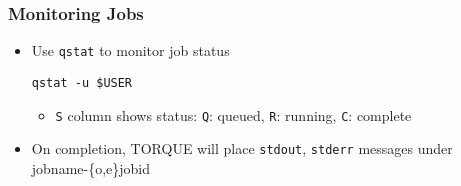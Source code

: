 \begin{frame}\frametitle{Monitoring Jobs}

\begin{itemize}
\item
  Use \texttt{qstat} to monitor job status

  \texttt{qstat -u \$USER}

  \begin{itemize}
  \itemsep1pt\parskip0pt
  \item
    \texttt{S} column shows status: \texttt{Q}: queued, \texttt{R}:
    running, \texttt{C}: complete
  \end{itemize}
\item
  On completion, TORQUE will place \texttt{stdout}, \texttt{stderr}
  messages under jobname-\{o,e\}jobid
\end{itemize}

\end{frame}

